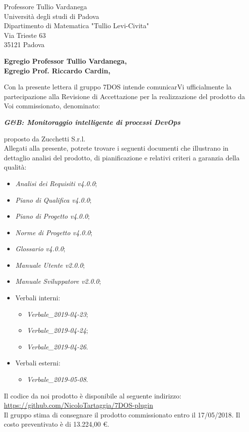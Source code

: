 \begin{letter}{Professore Tullio Vardanega \\ Università degli studi di Padova \\ Dipartimento di Matematica "Tullio Levi-Civita" \\ Via Trieste 63 \\ 35121 Padova}
\opening{\textbf{Egregio Professor Tullio Vardanega,\\Egregio Prof. Riccardo Cardin,}}
\begin{addmargin}[2em]{2em}
  Con la presente lettera il gruppo 7DOS intende comunicarVi ufficialmente la partecipazione alla Revisione di Accettazione per la realizzazione del prodotto da Voi commissionato, denominato:
   \singlespacing 
   \centerline{\textbf{\emph{G\&B: Monitoraggio intelligente di processi DevOps}}}
  \singlespacing
  proposto da Zucchetti S.r.l. \\
  Allegati alla presente, potrete trovare i seguenti documenti che illustrano in dettaglio analisi del prodotto, di pianificazione e relativi criteri a garanzia della qualità:
      \begin{itemize}
	      \item \emph{Analisi dei Requisiti v4.0.0};
	      \item \emph{Piano di Qualifica v4.0.0};
	      \item \emph{Piano di Progetto v4.0.0};
	      \item \emph{Norme di Progetto v4.0.0};
	      \item \emph{Glossario v4.0.0};
	      \item \emph{Manuale Utente v2.0.0};
   	      \item \emph{Manuale Sviluppatore v2.0.0};
	      \item Verbali interni:
	            \begin{itemize}
		           	\item \emph{Verbale\_2019-04-23};
		           	\item \emph{Verbale\_2019-04-24};
		           	\item \emph{Verbale\_2019-04-26}.
	           	\end{itemize}
          \item Verbali esterni:
          \begin{itemize}
          	\item \emph{Verbale\_2019-05-08}.
          \end{itemize}
	\end{itemize}

	Il codice da noi prodotto è disponibile al seguente indirizzo:\\[0.2cm]
	\hspace*{10mm}\url{https://github.com/NicoloTartaggia/7DOS-plugin}\\[0.2cm]
  Il gruppo stima di consegnare il prodotto commissionato entro il 17/05/2018. Il costo preventivato è di 13.224,00 \euro.\\
  

\end{addmargin}
\end{letter}

